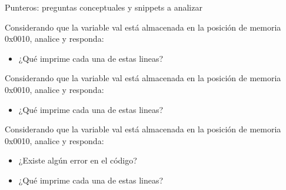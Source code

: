 \documentclass[xcolor=pdftex,table,11pt]{beamer}
\begin{document}
\begin{frame}[allowframebreaks]{Punteros: preguntas conceptuales y snippets a analizar}

Considerando que la variable val está almacenada en la posición de memoria 0x0010, analice y responda:

\codesetstylefrombeamer
{}


\begin{itemize}

\item ¿Qué imprime cada una de estas lineas?


\end{itemize}



\newpage
Considerando que la variable val está almacenada en la posición de memoria 0x0010, analice y responda:

\codesetstylefrombeamer
{}


\begin{itemize}

\item ¿Qué imprime cada una de estas lineas?


\end{itemize}



\newpage
Considerando que la variable val está almacenada en la posición de memoria 0x0010, analice y responda:

\codesetstylefrombeamer
{}


\begin{itemize}
\item ¿Existe algún error en el código?
\item ¿Qué imprime cada una de estas lineas?


\end{itemize}

\end{frame}
\end{document}
